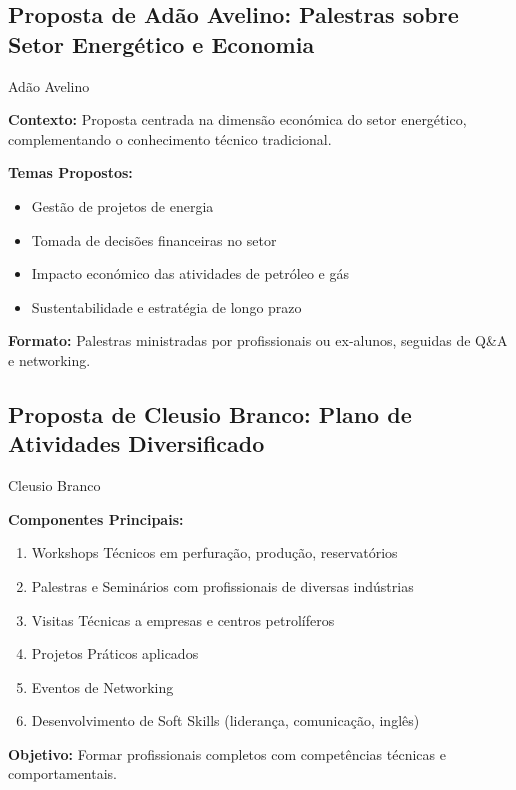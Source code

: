 \documentclass[12pt,a4paper,oneside]{article}
\begin{document}
\newpage



\subsection{Proposta de Adão Avelino: Palestras sobre Setor Energético e Economia}

\begin{proposalbox}{Adão Avelino}

\textbf{Contexto:} Proposta centrada na dimensão económica do setor energético, complementando o conhecimento técnico tradicional.

\medskip

\textbf{Temas Propostos:}
\begin{itemize}[label={\color{spe-secondary}▸}]
  \item Gestão de projetos de energia
  \item Tomada de decisões financeiras no setor
  \item Impacto económico das atividades de petróleo e gás
  \item Sustentabilidade e estratégia de longo prazo
\end{itemize}

\medskip

\textbf{Formato:} Palestras ministradas por profissionais ou ex-alunos, seguidas de Q\&A e networking.

\end{proposalbox}

\vspace{1.2cm}

\subsection{Proposta de Cleusio Branco: Plano de Atividades Diversificado}

\begin{proposalbox}{Cleusio Branco}

\textbf{Componentes Principais:}

\begin{enumerate}[label={\color{spe-accent}\arabic*}]
  \item Workshops Técnicos em perfuração, produção, reservatórios
  \item Palestras e Seminários com profissionais de diversas indústrias
  \item Visitas Técnicas a empresas e centros petrolíferos
  \item Projetos Práticos aplicados
  \item Eventos de Networking
  \item Desenvolvimento de Soft Skills (liderança, comunicação, inglês)
\end{enumerate}

\textbf{Objetivo:} Formar profissionais completos com competências técnicas e comportamentais.

\end{proposalbox}
\end{document}
